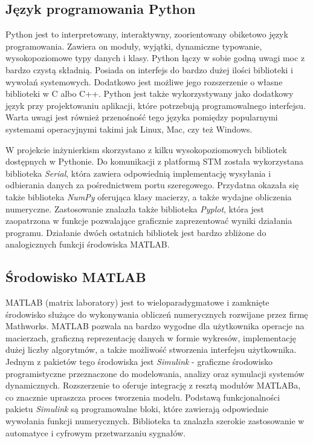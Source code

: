 \subsection{Język programowania Python} \label{sec:python}
Python jest to interpretowany, interaktywny, zoorientowany obiketowo język programowania.
Zawiera on moduły, wyjątki, dynamiczne typowanie, wysokopoziomowe typy danych i klasy.
Python łączy w sobie godną uwagi moc z bardzo czystą składnią. Posiada on interfejs do bardzo
dużej ilości biblioteki i wywołań systemowych. Dodatkowo jest możliwe jego rozszerzenie o własne
biblioteki w C albo C++. Python jest także wykorzystywany jako dodatkowy język przy projektowaniu
aplikacji, które potrzebują programowalnego interfejsu. Warta uwagi jest również przenośność
tego języka pomiędzy popularnymi systemami operacyjnymi takimi jak Linux, Mac, czy też Windows.

W projekcie inżynierkism skorzystano z kilku wysokopoziomowych bibliotek dostępnych
w Pythonie. Do komunikacji z platformą STM została wykorzystana biblioteka \textit{Serial}, która
zawiera odpowiednią implementację wysyłania i odbierania danych za pośrednictwem portu szeregowego.
Przydatna okazała się także biblioteka \textit{NumPy} oferująca klasy macierzy, a także wydajne
obliczenia numeryczne. Zastosowanie znalazła także biblioteka \textit{Pyplot}, która jest
zaopatrzona w funkcje pozwalające graficznie zaprezentować wyniki działania programu. Działanie
dwóch ostatnich bibliotek jest bardzo zbliżone do analogicznych funkcji środowiska MATLAB.

\subsection{Środowisko MATLAB} \label{sec:matlab}
MATLAB (matrix laboratory) jest to wieloparadygmatowe i zamknięte środowisko służące do wykonywania 
obliczeń numerycznych rozwijane przez firmę Mathworks. MATLAB pozwala na bardzo wygodne dla użytkownika
operacje na macierzach, graficzną reprezentację danych w formie wykresów, implementację dużej liczby
algorytmów, a także możliwość stworzenia interfejsu użytkownika. Jednym z pakietów tego środowiska 
jest \textit{Simulink} - graficzne środowisko programistyczne przeznaczone do modelowania, analizy
oraz symulacji systemów dynamicznych. Rozszerzenie to oferuje integrację z resztą modułów MATLABa,
co znacznie upraszcza proces tworzenia modelu. Podstawą funkcjonalności pakietu \textit{Simulink}
są programowalne bloki, które zawierają odpowiednie wywołania funkcji numerycznych. Biblioteka ta
znalazła szerokie zastosowanie w automatyce i cyfrowym przetwarzaniu sygnałów.

